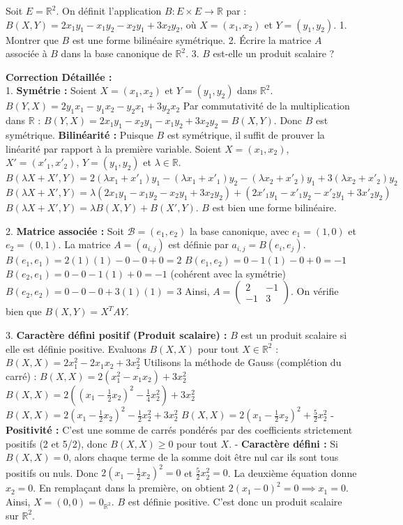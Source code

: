 \documentclass[11pt,a4paper]{report}
\begin{document}
Soit $E = \mathbb{R}^2$. On définit l'application $B : E \times E \to \mathbb{R}$ par :
$B(X, Y) = 2x_1y_1 - x_1y_2 - x_2y_1 + 3x_2y_2$, où $X = (x_1, x_2)$ et $Y = (y_1, y_2)$.
1. Montrer que $B$ est une forme bilinéaire symétrique.
2. Écrire la matrice $A$ associée à $B$ dans la base canonique de $\mathbb{R}^2$.
3. $B$ est-elle un produit scalaire ?

\textbf{Correction Détaillée :}\\ 1. \textbf{Symétrie :}
   Soient $X = (x_1, x_2)$ et $Y = (y_1, y_2)$ dans $\mathbb{R}^2$.
   $B(Y, X) = 2y_1x_1 - y_1x_2 - y_2x_1 + 3y_2x_2$
   Par commutativité de la multiplication dans $\mathbb{R}$ :
   $B(Y, X) = 2x_1y_1 - x_2y_1 - x_1y_2 + 3x_2y_2 = B(X, Y)$.
   Donc $B$ est symétrique.
   \textbf{Bilinéarité :}
   Puisque $B$ est symétrique, il suffit de prouver la linéarité par rapport à la première variable.
   Soient $X = (x_1, x_2)$, $X' = (x'_1, x'_2)$, $Y = (y_1, y_2)$ et $\lambda \in \mathbb{R}$.
   $B(\lambda X + X', Y) = 2(\lambda x_1 + x'_1)y_1 - (\lambda x_1 + x'_1)y_2 - (\lambda x_2 + x'_2)y_1 + 3(\lambda x_2 + x'_2)y_2$
   $B(\lambda X + X', Y) = \lambda(2x_1y_1 - x_1y_2 - x_2y_1 + 3x_2y_2) + (2x'_1y_1 - x'_1y_2 - x'_2y_1 + 3x'_2y_2)$
   $B(\lambda X + X', Y) = \lambda B(X, Y) + B(X', Y)$.
   $B$ est bien une forme bilinéaire.

2. \textbf{Matrice associée :}
   Soit $\mathcal{B} = (e_1, e_2)$ la base canonique, avec $e_1 = (1, 0)$ et $e_2 = (0, 1)$.
   La matrice $A = (a_{i,j})$ est définie par $a_{i,j} = B(e_i, e_j)$.
   $B(e_1, e_1) = 2(1)(1) - 0 - 0 + 0 = 2$
   $B(e_1, e_2) = 0 - 1(1) - 0 + 0 = -1$
   $B(e_2, e_1) = 0 - 0 - 1(1) + 0 = -1$ (cohérent avec la symétrie)
   $B(e_2, e_2) = 0 - 0 - 0 + 3(1)(1) = 3$
   Ainsi, $A = \begin{pmatrix} 2 & -1 \\ -1 & 3 \end{pmatrix}$.
   On vérifie bien que $B(X, Y) = X^T A Y$.

3. \textbf{Caractère défini positif (Produit scalaire) :}
   $B$ est un produit scalaire si elle est définie positive. Evaluons $B(X, X)$ pour tout $X \in \mathbb{R}^2$ :
   $B(X, X) = 2x_1^2 - 2x_1x_2 + 3x_2^2$
   Utilisons la méthode de Gauss (complétion du carré) :
   $B(X, X) = 2(x_1^2 - x_1x_2) + 3x_2^2$
   $B(X, X) = 2( (x_1 - \frac{1}{2}x_2)^2 - \frac{1}{4}x_2^2 ) + 3x_2^2$
   $B(X, X) = 2(x_1 - \frac{1}{2}x_2)^2 - \frac{1}{2}x_2^2 + 3x_2^2$
   $B(X, X) = 2(x_1 - \frac{1}{2}x_2)^2 + \frac{5}{2}x_2^2$
   - \textbf{Positivité :} C'est une somme de carrés pondérés par des coefficients strictement positifs (2 et 5/2), donc $B(X, X) \ge 0$ pour tout $X$.
   - \textbf{Caractère défini :} Si $B(X, X) = 0$, alors chaque terme de la somme doit être nul car ils sont tous positifs ou nuls.
     Donc $2(x_1 - \frac{1}{2}x_2)^2 = 0$ et $\frac{5}{2}x_2^2 = 0$.
     La deuxième équation donne $x_2 = 0$.
     En remplaçant dans la première, on obtient $2(x_1 - 0)^2 = 0 \implies x_1 = 0$.
     Ainsi, $X = (0, 0) = 0_{\mathbb{R}^2}$.
   $B$ est définie positive. C'est donc un produit scalaire sur $\mathbb{R}^2$.
\end{document}
